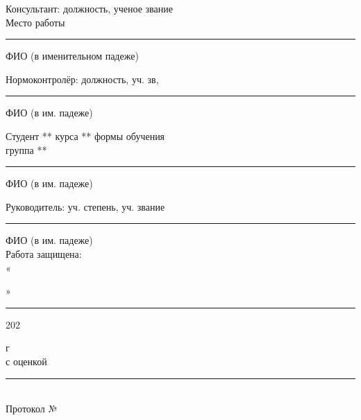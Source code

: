 		\vspace{2.5em}
		
   \hspace{-5em} 


\noindent
\begin{minipage}[t]{0.5\textwidth}
  \begin{flushleft}
  \linespread{1}
	\small{
    Консультант: должность, ученое звание \\
  Место работы\\
        \rule{1,8cm}{0,1pt} ФИО (в именительном падеже)\\
	\vspace{2em}
		
	Нормоконтролёр: должность, уч. зв,\\
            \rule{1,8cm}{0,1pt} ФИО (в им. падеже)\\
}
		
		
		\end{flushleft}
\end{minipage}%
\begin{minipage}[t]{0.5\textwidth}
  \begin{flushleft}
  \linespread{1}
	\small{
    Студент ** курса
	** формы обучения \\
  группа **\\
        \rule{1,8cm}{0,1pt} ФИО (в им. падеже)\\
	\vspace{2em}
		
	Руководитель: уч. степень, уч. звание\\
            \rule{1,8cm}{0,1pt} ФИО (в им. падеже)\\
\vspace{2em}
 Работа защищена:\\
        «\rule{0,9cm}{0,1pt}»\rule{2,7cm}{0,1pt} 202\,\rule{0,2cm}{0,1pt} г \\
с оценкой \rule{1,8cm}{0,1pt}\\
Протокол № \rule{0,9cm}{0,1pt}}
		
		
		\end{flushleft}
\end{minipage}
\vfill


\newpage